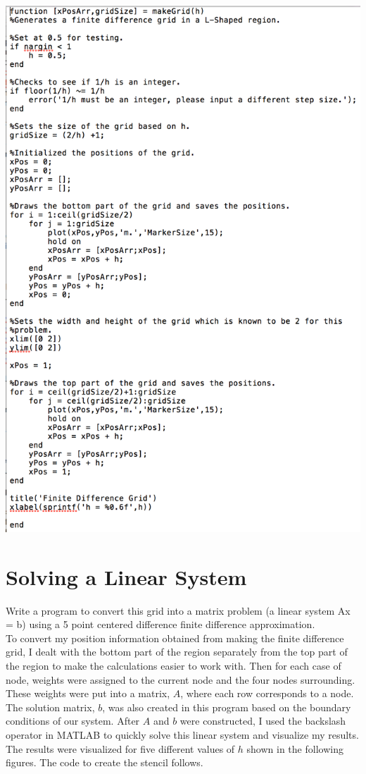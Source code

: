 \documentclass[11pt, oneside]{article}   	%
\begin{document}
\centerline{\includegraphics[scale = 0.7]{MakeGridCode.png}}

\section{Solving a Linear System}

Write a program to convert this grid into a matrix problem (a linear system Ax = b) using a 5 point centered difference finite difference approximation. \\

To convert my position information obtained from making the finite difference grid, I dealt with the bottom part of the region separately from the top part of the region to make the calculations easier to work with. Then for each case of node, weights were assigned to the current node and the four nodes surrounding. These weights were put into a matrix, $A$, where each row corresponds to a node. The solution matrix, $b$, was also created in this program based on the boundary conditions of our system. After $A$ and $b$ were constructed, I used the backslash operator in MATLAB to quickly solve this linear system and visualize my results. The results were visualized for five different values of $h$ shown in the following figures. The code to create the stencil follows. \\
\end{document}
